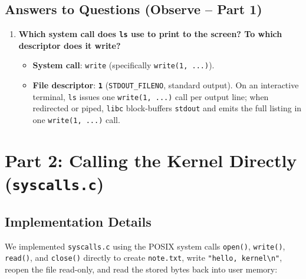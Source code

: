 \documentclass[12pt,a4paper]{article}
\begin{document}
\subsection{Answers to Questions (Observe -- Part 1)}
\begin{enumerate}
    \item \textbf{Which system call does \texttt{ls} use to print to the screen? To which descriptor does it write?}
    \begin{itemize}
        \item \textbf{System call}: \texttt{write} (specifically \texttt{write(1, ...)}).
        \item \textbf{File descriptor}: \textbf{\texttt{1}} (\texttt{STDOUT\_FILENO}, standard output). On an interactive terminal, \texttt{ls} issues one \texttt{write(1, ...)} call per output line; when redirected or piped, \texttt{libc} block-buffers \texttt{stdout} and emits the full listing in one \texttt{write(1, ...)} call.
    \end{itemize}
\end{enumerate}

\section{Part 2: Calling the Kernel Directly (\texttt{syscalls.c})}

\subsection{Implementation Details}
We implemented \texttt{syscalls.c} using the POSIX system calls \texttt{open()}, \texttt{write()}, \texttt{read()}, and \texttt{close()} directly to create \texttt{note.txt}, write \texttt{"hello, kernel\textbackslash n"}, reopen the file read-only, and read the stored bytes back into user memory:
\end{document}
